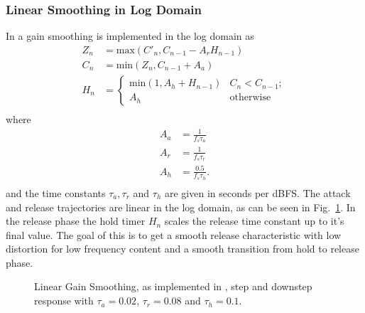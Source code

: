 \documentclass[../main2.tex]{subfiles}
\providecommand{\rootdir}{..}
\begin{document}
\subsubsection{Linear Smoothing in Log Domain}
In \cite{frindle1996implementation} a gain smoothing is implemented in the log domain as
\begin{equation}
\begin{split}
Z_n &= \text{max}(C'_n, C_{n-1} - A_r H_{n-1} )\\
C_n &= \text{min}(Z_n, C_{n-1} + A_a) \\
H_n &=
\begin{cases}
    \text{min}(1,A_h + H_{n-1})	& C_n < C_{n-1}; \\
    A_h					& \text{otherwise}
\end{cases} \\
\end{split}
\end{equation}
where
\begin{equation}
\begin{split}
A_a &= \frac{1}{f_s \tau_a} \\
A_r &= \frac{1}{f_s \tau_r} \\
A_h &= \frac{0.5}{f_s \tau_h}. \\
\end{split}
\end{equation}
and the time constants $\tau_a, \tau_r$ and $\tau_h$ are given in seconds per dBFS. The attack and release trajectories are linear in the log domain, as can be seen in Fig.~\ref{fig:step_frindle_gain}. In the release phase the hold timer $H_n$ scales the release time constant up to it's final value. The goal of this is to get a smooth release characteristic with low distortion for low frequency content and a smooth transition from hold to release phase.
\begin{figure}[h]
\centerline{}
\caption{Linear Gain Smoothing, as implemented in \cite{frindle1996implementation}, step and downstep response with $\tau_a=0.02$, $\tau_r=0.08$ and $\tau_h= 0.1$.}
\label{fig:step_frindle_gain}
\end{figure}
\end{document}
